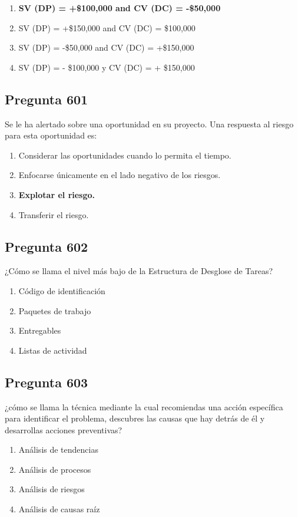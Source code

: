 \documentclass[11pt,a4paper]{article}
\begin{document}
\begin{enumerate}[label=\alph*)]
  \item \textbf{SV (DP) = +\$100,000 and CV (DC) = -\$50,000}
  \item SV (DP) = +\$150,000 and CV (DC) = \$100,000
  \item SV (DP) = -\$50,000 and CV (DC) = +\$150,000
  \item SV (DP) = - \$100,000 y CV (DC) = + \$150,000
\end{enumerate}

\subsection*{Pregunta 601}
Se le ha alertado sobre una oportunidad en su proyecto. Una respuesta al riesgo para esta oportunidad es:

\begin{enumerate}[label=\alph*)]
  \item Considerar las oportunidades cuando lo permita el tiempo.
  \item Enfocarse únicamente en el lado negativo de los riesgos.
  \item \textbf{Explotar el riesgo.}
  \item Transferir el riesgo.
\end{enumerate}

\subsection*{Pregunta 602}
¿Cómo se llama el nivel más bajo de la Estructura de Desglose de Tareas?

\begin{enumerate}[label=\alph*)]
  \item Código de identificación
  \item Paquetes de trabajo
  \item Entregables
  \item Listas de actividad
\end{enumerate}

\subsection*{Pregunta 603}
¿cómo se llama la técnica mediante la cual recomiendas una acción específica para identificar el problema, descubres las causas que hay detrás de él y desarrollas acciones preventivas?

\begin{enumerate}[label=\alph*)]
  \item Análisis de tendencias
  \item Análisis de procesos
  \item Análisis de riesgos
  \item Análisis de causas raíz
\end{enumerate}
\end{document}
